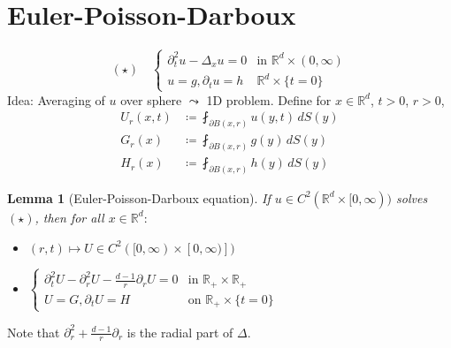 \documentclass{report}
\theoremstyle{tommy}
\newtheorem{lem}[defn]{Lemma}
\begin{document}
  \section{Euler-Poisson-Darboux}
  \[(\star) \quad \begin{cases}
    \partial_t^2 u - \Delta_x u = 0 &\text{in } \mathbb{R}^d \times (0,\infty) \\
    u = g, \partial_t u = h &\mathbb{R}^d \times \{t = 0\}
  \end{cases}\]
  Idea: Averaging of \(u\) over sphere \(\leadsto\) 1D problem.
  Define for \(x \in \mathbb{R}^d\), \(t > 0\), \(r > 0\),
  \begin{align*}
    U_r(x,t) &\coloneqq \fint_{\partial B(x,r)} u(y,t) \, dS(y) \\
    G_r(x) &\coloneqq \fint_{\partial B(x,r)} g(y) \, dS(y) \\
    H_r(x) &\coloneqq \fint_{\partial B(x,r)} h(y) \, dS(y)
  \end{align*}

  \begin{lem}[Euler-Poisson-Darboux equation]
    If \(u \in C^2(\mathbb{R}^d \times [0,\infty))\) solves \((\star)\), then for all \(x \in \mathbb{R}^d:\)
    \begin{itemize}
      \item \((r,t) \mapsto U \in C^2([0,\infty) \times [0,\infty)])\)
      \item \(\begin{cases}
        \partial_t^2 U - \partial_r^2 U - \frac{d-1}{r}\partial_r U = 0 &\text{in } \mathbb{R}_+ \times \mathbb{R}_+ \\
        U = G, \partial_t U = H &\text{on }\mathbb{R}_+ \times \{t=0\}
         \end{cases}\)
    \end{itemize}
  \end{lem}

  Note that \(\partial_r^2 + \frac{d-1}{r}\partial_r\) is the radial part of \(\Delta\).
\end{document}
